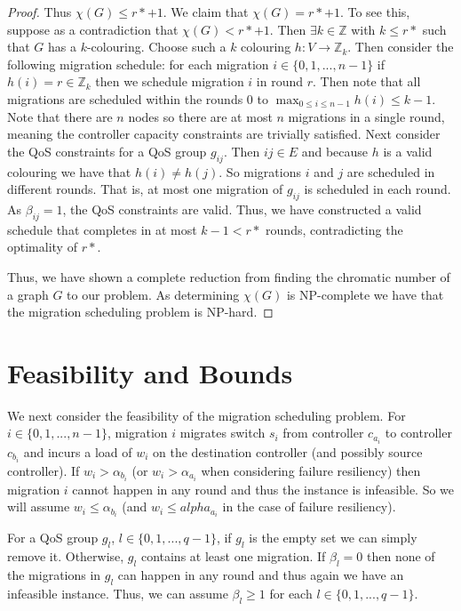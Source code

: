 \documentclass[letterpaper,12pt,titlepage,oneside,final]{article}
\begin{document}
\begin{proof}
    Thus $\chi(G) \leq r* + 1$. We claim that $\chi(G) = r* + 1$. To see this, suppose as a contradiction that $\chi(G) < r* + 1$. Then $\exists k \in \mathbb{Z}$ with $k \leq r*$ such that $G$ has a $k$-colouring. Choose such a $k$ colouring $h: V \rightarrow \mathbb{Z}_{k}$. Then consider the following migration schedule: for each migration $i \in \{0, 1, ..., n-1\}$ if $h(i) = r \in \mathbb{Z}_{k}$ then we schedule migration $i$ in round $r$. Then note that all migrations are scheduled within the rounds 0 to $\max_{0 \leq i \leq n-1} h(i) \leq k - 1$. Note that there are $n$ nodes so there are at most $n$ migrations in a single round, meaning the controller capacity constraints are trivially satisfied. Next consider the QoS constraints for a QoS group $g_{ij}$. Then $ij \in E$ and because $h$ is a valid colouring we have that $h(i) \neq h(j)$. So migrations $i$ and $j$ are scheduled in different rounds. That is, at most one migration of $g_{ij}$ is scheduled in each round. As $\beta_{ij} = 1$, the QoS constraints are valid. Thus, we have constructed a valid schedule that completes in at most $k - 1 < r*$ rounds, contradicting the optimality of $r*$.
    
    Thus, we have shown a complete reduction from finding the chromatic number of a graph $G$ to our problem. As determining $\chi(G)$ is NP-complete we have that the migration scheduling problem is NP-hard. 
\end{proof}

\section{Feasibility and Bounds}
\noindent We next consider the feasibility of the migration scheduling problem. For $i \in \{0, 1, ..., n-1\}$, migration $i$ migrates switch $s_{i}$ from controller $c_{a_{i}}$ to controller $c_{b_{i}}$ and incurs a load of $w_{i}$ on the destination controller (and possibly source controller). If $w_{i} > \alpha_{b_{i}}$ (or $w_{i} > \alpha_{a_{i}}$ when considering failure resiliency) then migration $i$ cannot happen in any round and thus the instance is infeasible. So we will assume $w_{i} \leq \alpha_{b_{i}}$ (and $w_{i} \leq alpha_{a_{i}}$ in the case of failure resiliency).

For a QoS group $g_{l}$, $l \in \{0, 1, ..., q - 1\}$, if $g_{l}$ is the empty set we can simply remove it. Otherwise, $g_{l}$ contains at least one migration. If $\beta_{l} = 0$ then none of the migrations in $g_{l}$ can happen in any round and thus again we have an infeasible instance. Thus, we can assume $\beta_{l} \geq 1$ for each $l \in \{0, 1, ..., q - 1\}$.
\end{document}
